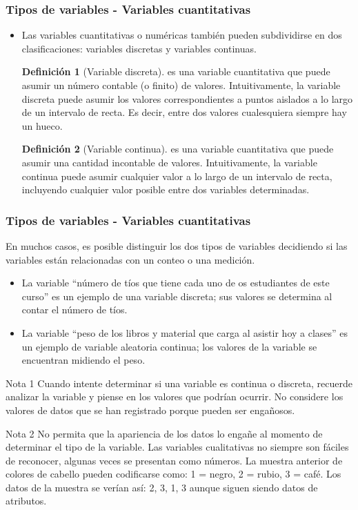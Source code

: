 \documentclass[10pt]{beamer}
\theoremstyle{plain} %
\theoremstyle{definition}
\newtheorem{defn}{Definición}
\theoremstyle{remark}
\begin{document}
\begin{frame}
\frametitle{Tipos de variables - Variables cuantitativas}
\begin{itemize}[<+->]
\justifying
\item Las variables cuantitativas o numéricas también pueden subdividirse en dos clasificaciones: variables discretas y variables continuas.
\begin{defn}[Variable discreta]
es una variable cuantitativa que puede asumir un número contable (o finito) de valores. Intuitivamente, la variable discreta puede asumir los valores correspondientes a puntos aislados a lo largo de un intervalo de recta. Es decir, entre dos valores cualesquiera siempre hay un hueco.
\end{defn}

\begin{defn}[Variable continua]
es una variable cuantitativa que puede asumir una cantidad incontable de valores. Intuitivamente, la variable continua puede asumir cualquier valor a lo largo de un intervalo de recta, incluyendo cualquier valor posible entre dos variables determinadas.
\end{defn}
\end{itemize}
\end{frame}

\begin{frame}
\frametitle{Tipos de variables - Variables cuantitativas}
En muchos casos, es posible distinguir los dos tipos de variables decidiendo si las variables están relacionadas con un conteo o una medición.
\begin{itemize}[<+->]
\justifying
\item La variable ``número de tíos que tiene cada uno de os estudiantes de este curso'' es un ejemplo de una variable discreta; sus valores se determina al contar el número de tíos.
\item La variable ``peso de los libros y material que carga al asistir hoy a clases'' es un ejemplo de variable aleatoria continua; los valores de la variable se encuentran midiendo el peso.
\end{itemize}
\end{frame}

\begin{frame}
\begin{alertblock}{Nota 1}
\justifying
Cuando intente determinar si una variable es continua o discreta, recuerde analizar la variable y piense en los valores que podrían ocurrir. No considere los valores de datos que se han registrado porque pueden ser engañosos.
\end{alertblock}
\begin{alertblock}{Nota 2}
\justifying
No permita que la apariencia de los datos lo engañe al momento de determinar el tipo de la variable. Las variables cualitativas no siempre son fáciles de reconocer, algunas veces se presentan como números. La muestra anterior de colores de cabello pueden codificarse como: 1 = negro, 2 = rubio, 3 = café. Los datos de la muestra se verían así: {2, 3, 1, 3} aunque siguen siendo datos de atributos.
\end{alertblock}

\end{frame}
\end{document}
